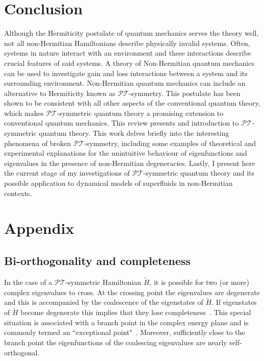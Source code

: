 \documentclass[12pt, a4paper]{report}
\newcommand\PT{\(\mathcal{PT}\)}
\begin{document}
\chapter{Conclusion}\label{Conclusion}
Although the Hermiticity postulate of quantum mechanics serves the theory well, not all non-Hermitian Hamiltonians describe physically invalid systems. Often, systems in nature interact with an environment and these interactions describe crucial features of said systems. A theory of Non-Hermitian quantum mechanics can be used to investigate gain and loss interactions between a system and its surrounding environment. Non-Hermitian quantum mechanics can include an alternative to Hermiticity known as \PT-symmetry. This postulate has been shown to be consistent with all other aspects of the conventional quantum theory, which makes \PT-symmetric quantum theory a promising extension to conventional quantum mechanics. This review presents and introduction to \PT-symmetric quantum theory. This work delves briefly into the interesting phenomena of broken \PT-symmetry, including some examples of theoretical and experimental explanations for the unintuitive behaviour of eigenfunctions and eigenvalues in the presence of non-Hermitian degeneracies. Lastly, I present here the current stage of my investigations of \PT-symmetric quantum theory and its possible application to dynamical models of superfluids in non-Hermitian contexts.


\chapter{Appendix}\label{appendix}
\section{Bi-orthogonality and completeness}\label{Biorthogonal}
In the case of a \PT-symmetric Hamiltonian $\tilde{H}$, it is possible for two (or more) complex eigenvalues to cross. At the crossing point the eigenvalues are degenerate and this is accompanied by the coalescence of the eigenstates of $\tilde{H}$. If eigenstates of $\tilde{H}$ become degenerate this implies that they lose completeness~\cite{Brody_2013}. This special situation is associated with a branch point in the complex energy plane and is commonly termed an ``exceptional point"~\cite{Moiseyev}. Moreover, sufficiently close to the branch point the eigenfunctions of the coalescing eigenvalues are nearly self-orthogonal.
\end{document}
